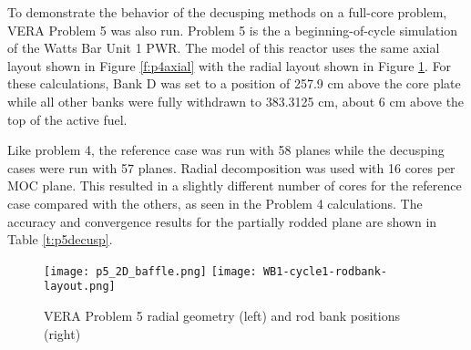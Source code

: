To demonstrate the behavior of the decusping methods on a full-core problem, VERA Problem 5 was also run.  Problem 5 is the a beginning-of-cycle simulation of the Watts Bar Unit 1 PWR.  The model of this reactor uses the same axial layout shown in Figure \ref{f:p4axial} with the radial layout shown in Figure \ref{f:p5radial}.  For these calculations, Bank D was set to a position of 257.9 cm above the core plate while all other banks were fully withdrawn to 383.3125 cm, about 6 cm above the top of the active fuel.

Like problem 4, the reference case was run with 58 planes while the decusping cases were run with 57 planes.  Radial decomposition was used with 16 cores per MOC plane.  This resulted in a slightly different number of cores for the reference case compared with the others, as seen in the Problem 4 calculations.  The accuracy and convergence results for the partially rodded plane are shown in Table \ref{t:p5decusp}.

\begin{figure}[h]
\centering
\texttt{[image: p5\_2D\_baffle.png]}
\hfill
\texttt{[image: WB1-cycle1-rodbank-layout.png]}
\caption{VERA Problem 5 radial geometry (left) and rod bank positions (right)}\label{f:p5radial}
\end{figure}

\begin{table}[h]
\centering
\caption[VERA Problem 5 Decusping Results]{VERA Problem 5 decusping results for the partially rodded plane}\label{t:p5decusp}
\end{table}

